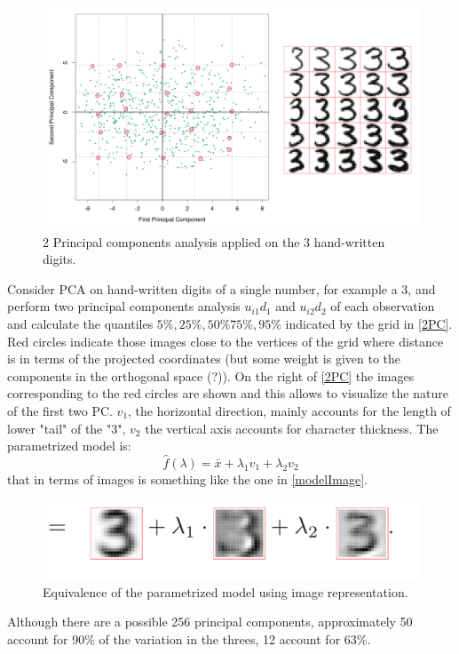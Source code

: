 \documentclass[12pt, letterpaper]{article}
\theoremstyle{definition}
\begin{document}
\begin{figure}
\centering
\includegraphics[scale=0.5]{img/2PC}
\caption{2 Principal components analysis applied on the $3$ hand-written digits.}
\label{2PC}
\end{figure}
Consider PCA on hand-written digits of a single number, for example a $3$, and perform two principal components analysis $u_{i1}d_1$ and $u_{i2}d_2$ of each observation and calculate the quantiles $5\%, 25\%, 50\% 75\%, 95\%$ indicated by the grid in \autoref{2PC}. Red circles indicate those images close to the vertices of the grid where distance is in terms of the projected coordinates (but some weight is given to the components in the orthogonal space (?)). On the right of \autoref{2PC} the images corresponding to the red circles are shown and this allows to visualize the nature of the first two PC. $v_1$, the horizontal direction, mainly accounts for the length of lower "tail" of the "$3$", $v_2$ the vertical axis  accounts for character thickness. The parametrized model is:
\begin{equation}
\hat{f}(\lambda) = \bar{x} + \lambda_1 v_1+\lambda_2 v_2 
\end{equation}
that in terms of images is something like the one in \autoref{modelImage}.


\begin{figure}
\centering
\includegraphics[scale=0.7]{img/modelImage}
\caption{Equivalence of the parametrized model using image representation.}
\label{modelImage}
\end{figure}
Although there are a possible 256 principal components, approximately 50 account for 90\% of the variation in the threes, 12 account for 63\%.
\end{document}
